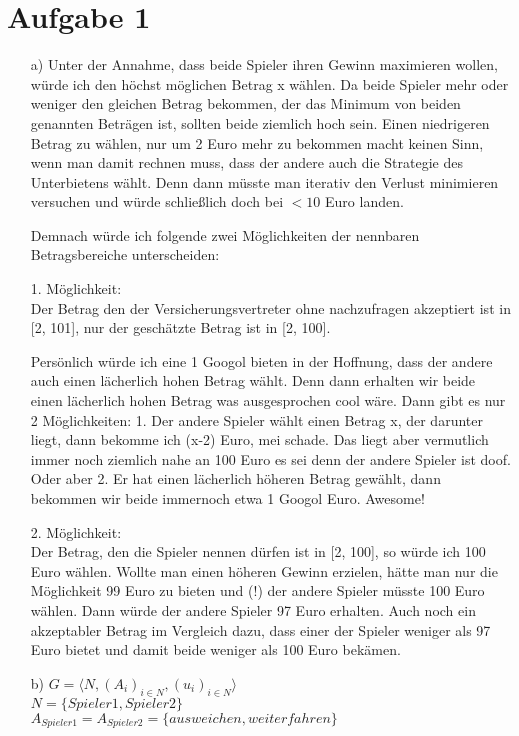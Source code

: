 \documentclass{article}
\begin{document}
\section*{Aufgabe 1}
	\begin{enumerate}
		\item [a)]
		Unter der Annahme, dass beide Spieler ihren Gewinn maximieren wollen, würde
		ich den höchst möglichen Betrag x wählen. Da beide Spieler mehr oder weniger
		den gleichen Betrag bekommen, der das Minimum von beiden genannten Beträgen ist,
		sollten beide ziemlich hoch sein. Einen niedrigeren Betrag zu wählen, nur um
		2 Euro mehr zu bekommen macht keinen Sinn, wenn man damit rechnen muss, dass der
		andere auch die Strategie des Unterbietens wählt. Denn dann müsste man iterativ
		den Verlust minimieren versuchen und würde schließlich doch bei $<10$ Euro landen.
		
		Demnach würde ich folgende zwei Möglichkeiten der nennbaren Betragsbereiche
		unterscheiden:
		
		1. Möglichkeit:\\ 
		Der Betrag den der Versicherungsvertreter ohne nachzufragen akzeptiert ist in [2, 101],
		nur der geschätzte Betrag ist in [2, 100].
		
		Persönlich würde ich eine 1 Googol bieten in der Hoffnung, dass der andere auch
		einen lächerlich hohen Betrag wählt. Denn dann erhalten wir beide einen
		lächerlich hohen Betrag was ausgesprochen cool wäre. Dann gibt es
		nur 2 Möglichkeiten:
		1. Der andere Spieler wählt einen Betrag x, der darunter liegt, dann bekomme ich
		(x-2) Euro, mei schade. Das liegt aber vermutlich immer noch ziemlich nahe an
		100 Euro es sei denn der andere Spieler ist doof. Oder aber
		2. Er hat einen lächerlich höheren Betrag gewählt, dann bekommen wir beide
		immernoch etwa 1 Googol Euro. Awesome!
		
		2. Möglichkeit:\\
		Der Betrag, den die Spieler nennen dürfen ist in [2, 100], so würde ich 100 Euro
		wählen.
		Wollte man einen höheren Gewinn erzielen, hätte man nur
		die Möglichkeit 99 Euro zu bieten und (!) der andere Spieler müsste 100 Euro wählen.
		Dann würde der andere Spieler 97 Euro erhalten. Auch noch ein akzeptabler Betrag im
		Vergleich dazu, dass einer der Spieler weniger als 97 Euro bietet und damit beide
		weniger als 100 Euro bekämen.

		\item [b)]
			$G = \langle N, (A_i)_{i \in N}, (u_i)_{i \in N} \rangle$ \\
			$N = \{ Spieler1, Spieler2 \}$\\
			$A_{Spieler1} = A_{Spieler2} = \{ \mathit{ausweichen}, \mathit{weiterfahren}\}$\\
			

\end{enumerate}
\end{document}
